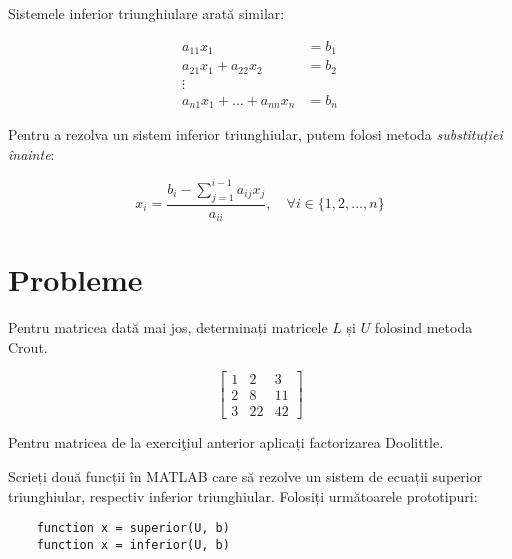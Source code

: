 \documentclass{exam}
\newcommand{\octavescript}[2]{
	
}
\begin{document}
\octavescript{./src/superior.m}{}

\par Sistemele inferior triunghiulare arată similar:

\begin{align*}
	a_{11} x_1                       & = b_1 \\
	a_{21} x_1 + a_{22} x_2          & = b_2 \\
	\vdots                                   \\
	a_{n1} x_1 + \ldots + a_{nn} x_n & = b_n
\end{align*}

\par Pentru a rezolva un sistem inferior triunghiular, putem folosi metoda
\textit{substituției înainte}:

\begin{equation}
	x_i = \frac{b_i - \sum_{j = 1}^{i - 1}{a_{ij} x_j}}{a_{ii}}, \quad \forall i \in \{1, 2, \ldots, n\}
\end{equation}

\octavescript{./src/inferior.m}{}

\newpage
\section{Probleme}

\begin{questions}
	\boxedpoints
	\pointsinmargin

	\question Pentru matricea dată mai jos, determinați matricele $L$ și $U$
	folosind metoda Crout.

	\begin{equation*}
		\begin{bmatrix}
			1 & 2  & 3  \\
			2 & 8  & 11 \\
			3 & 22 & 42
		\end{bmatrix}
	\end{equation*}

	\question Pentru matricea de la exerciţiul anterior aplicați factorizarea
	Doolittle.

	\question Scrieți două funcții în MATLAB care să rezolve un sistem de
	ecuații superior triunghiular, respectiv inferior triunghiular. Folosiți
	următoarele prototipuri:

	\begin{verbatim}
	function x = superior(U, b)
	function x = inferior(U, b)
	\end{verbatim}

\end{questions}
\end{document}
